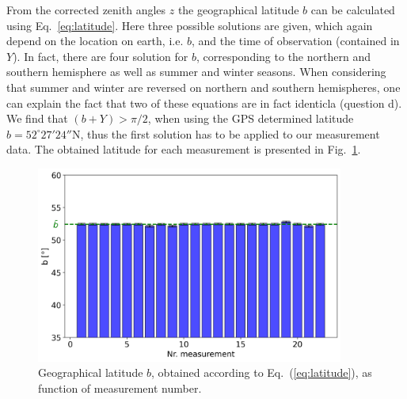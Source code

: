 \label{chap:fazit}

From the corrected zenith angles $z$ the geographical latitude $b$ can be calculated using Eq.~\ref{eq:latitude}. Here three possible solutions are given, which again depend on the location on earth, i.e. $b$, and the time of observation (contained in $Y$). In fact, there are four solution for $b$, corresponding to the northern and southern hemisphere as well as summer and winter seasons. When considering that summer and winter are reversed on northern and southern hemispheres, one can explain the fact that two of these equations are in fact identicla (question d).\\
We find that $(b+Y)>\pi/2$, when using the GPS determined latitude $b=52^\circ 27' 24''$N, thus the first solution has to be applied to our measurement data. The obtained latitude for each measurement is presented in Fig.~\ref{fig:latitude}.

\begin{figure}[]
    \centering
    \includegraphics[width=0.9\textwidth]{05-Fazit/histogram.png}
    \caption{Geographical latitude $b$, obtained according to Eq.~(\ref{eq:latitude}), as function of measurement number.}
    \label{fig:latitude}
\end{figure}


